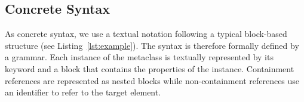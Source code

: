 
\subsection{Concrete Syntax}
\label{sec:our-dsl:concrete-syntax}

As concrete syntax, we use a textual notation following a typical block-based structure (see Listing~\ref{lst:example}).
The syntax is therefore formally defined by a grammar. %
Each instance of the metaclass is textually represented by its keyword and a block that contains the properties of the instance.
Containment references are represented as nested blocks while non-containment references use an identifier to refer to the target element.


